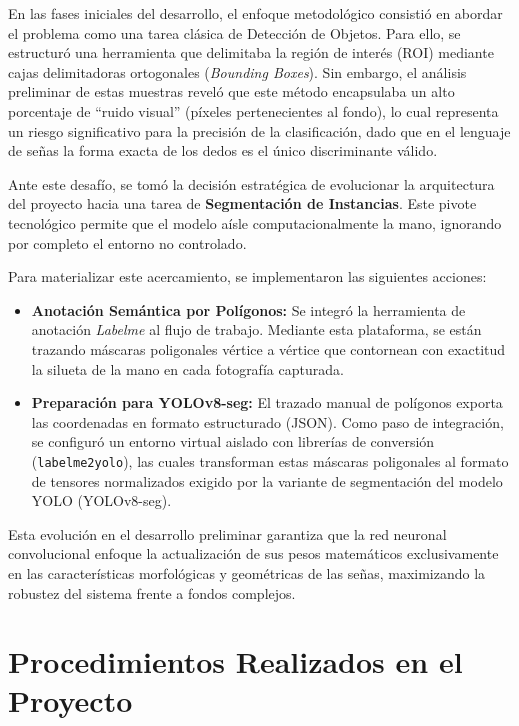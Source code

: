 \documentclass[12pt,letterpaper]{article}
\begin{document}
En las fases iniciales del desarrollo, el enfoque metodológico consistió en abordar el problema como una tarea clásica de Detección de Objetos. Para ello, se estructuró una herramienta que delimitaba la región de interés (ROI) mediante cajas delimitadoras ortogonales (\textit{Bounding Boxes}). Sin embargo, el análisis preliminar de estas muestras reveló que este método encapsulaba un alto porcentaje de ``ruido visual'' (píxeles pertenecientes al fondo), lo cual representa un riesgo significativo para la precisión de la clasificación, dado que en el lenguaje de señas la forma exacta de los dedos es el único discriminante válido.

Ante este desafío, se tomó la decisión estratégica de evolucionar la arquitectura del proyecto hacia una tarea de \textbf{Segmentación de Instancias}. Este pivote tecnológico permite que el modelo aísle computacionalmente la mano, ignorando por completo el entorno no controlado.

Para materializar este acercamiento, se implementaron las siguientes acciones:
\begin{itemize}
    \item \textbf{Anotación Semántica por Polígonos:} Se integró la herramienta de anotación \textit{Labelme} al flujo de trabajo. Mediante esta plataforma, se están trazando máscaras poligonales vértice a vértice que contornean con exactitud la silueta de la mano en cada fotografía capturada.
    \item \textbf{Preparación para YOLOv8-seg:} El trazado manual de polígonos exporta las coordenadas en formato estructurado (JSON). Como paso de integración, se configuró un entorno virtual aislado con librerías de conversión (\texttt{labelme2yolo}), las cuales transforman estas máscaras poligonales al formato de tensores normalizados exigido por la variante de segmentación del modelo YOLO (YOLOv8-seg).
\end{itemize}

Esta evolución en el desarrollo preliminar garantiza que la red neuronal convolucional enfoque la actualización de sus pesos matemáticos exclusivamente en las características morfológicas y geométricas de las señas, maximizando la robustez del sistema frente a fondos complejos.

\section{Procedimientos Realizados en el Proyecto}
\end{document}
